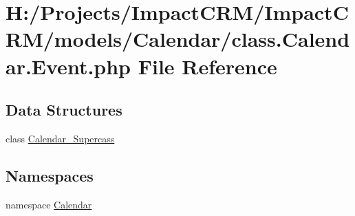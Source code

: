 \hypertarget{class_8Calendar_8Event_8php}{
\section{H:/Projects/ImpactCRM/ImpactCRM/models/Calendar/class.Calendar.Event.php File Reference}
\label{class_8Calendar_8Event_8php}
}
\subsection*{Data Structures}
\begin{DoxyCompactItemize}
\item 
class \hyperlink{classCalendar__Supercass}{Calendar\_\-Supercass}
\end{DoxyCompactItemize}
\subsection*{Namespaces}
\begin{DoxyCompactItemize}
\item 
namespace \hyperlink{namespaceCalendar}{Calendar}
\end{DoxyCompactItemize}
